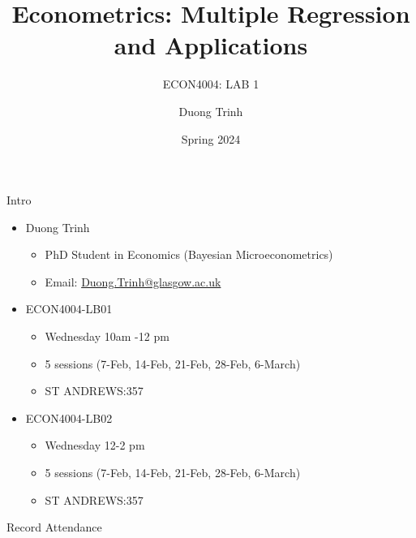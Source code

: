 \documentclass[
  10pt,
  ignorenonframetext,
]{beamer}
\title{Econometrics: Multiple Regression and Applications}
\subtitle{ECON4004: LAB 1}
\author{Duong Trinh}
\date{Spring 2024}
\institute{University of Glasgow}
\providecommand{\tightlist}{%
  \setlength{\itemsep}{0pt}\setlength{\parskip}{0pt}}
\begin{document}
\frame{\titlepage}

\begin{frame}{Intro}
\protect\hypertarget{intro}{}
\begin{itemize}
\tightlist
\item
  Duong Trinh

  \begin{itemize}
  \tightlist
  \item
    PhD Student in Economics (Bayesian Microeconometrics)
  \item
    Email: \underline{Duong.Trinh@glasgow.ac.uk}
  \end{itemize}
\end{itemize}

\vspace{3mm}

\begin{itemize}
\tightlist
\item
  ECON4004-LB01

  \begin{itemize}
  \tightlist
  \item
    Wednesday 10am -12 pm
  \item
    5 sessions (7-Feb, 14-Feb, 21-Feb, 28-Feb, 6-March)
  \item
    ST ANDREWS:357
  \end{itemize}
\item
  ECON4004-LB02

  \begin{itemize}
  \tightlist
  \item
    Wednesday 12-2 pm
  \item
    5 sessions (7-Feb, 14-Feb, 21-Feb, 28-Feb, 6-March)
  \item
    ST ANDREWS:357
  \end{itemize}
\end{itemize}
\end{frame}

\begin{frame}{Record Attendance}
\protect\hypertarget{record-attendance}{}
\end{frame}
\end{document}
